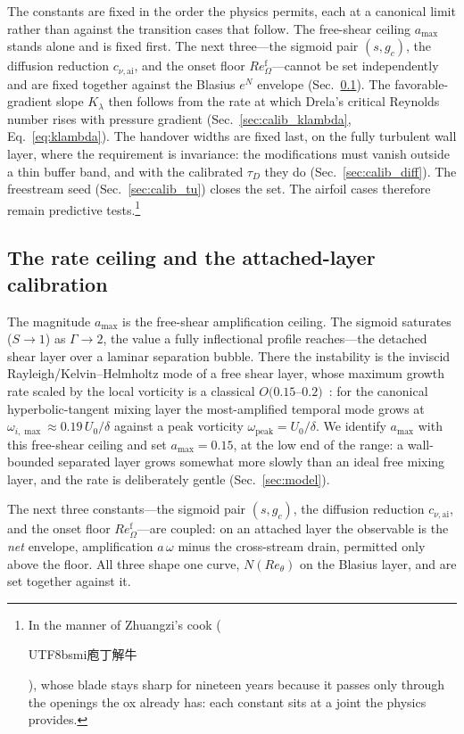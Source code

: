 \documentclass[journal]{new-aiaa}
\begin{document}
The constants are fixed in the order the physics permits, each at a
canonical limit rather than against the transition cases that follow. The
free-shear ceiling $a_{\max}$ stands alone and is fixed first. The next
three---the sigmoid pair $(s,g_c)$, the diffusion reduction
$c_{\nu,\mathrm{ai}}$, and the onset floor $Re_\Omega^{\mathrm{f}}$---cannot
be set independently and are fixed together against the Blasius $e^N$
envelope (Sec.~\ref{sec:calib_rate}). The favorable-gradient slope
$K_\lambda$ then follows from the rate at which Drela's critical Reynolds
number rises with pressure gradient (Sec.~\ref{sec:calib_klambda},
Eq.~\eqref{eq:klambda}). The handover widths are fixed last, on the fully
turbulent wall layer, where the requirement is invariance: the modifications
must vanish outside a thin buffer band, and with the calibrated $\tau_D$
they do (Sec.~\ref{sec:calib_diff}). The freestream seed
(Sec.~\ref{sec:calib_tu}) closes the set. The airfoil cases therefore remain
predictive tests.\footnote{In the manner of Zhuangzi's cook
(\begin{CJK}{UTF8}{bsmi}庖丁解牛\end{CJK}), whose blade stays sharp for
nineteen years because it passes only through the openings the ox already
has: each constant sits at a joint the physics provides.}

\subsection{The rate ceiling and the attached-layer calibration}\label{sec:calib_rate}

The magnitude $a_{\max}$ is the free-shear amplification ceiling. The sigmoid
saturates ($S\!\to\!1$) as $\Gamma\!\to\!2$, the value a fully inflectional
profile reaches---the detached shear layer over a laminar separation bubble.
There the instability is the inviscid Rayleigh/Kelvin--Helmholtz mode of a free
shear layer, whose maximum growth rate scaled by the local vorticity is a
classical $O(0.15$--$0.2)$~\cite{michalke_1964}: for the canonical
hyperbolic-tangent mixing layer the most-amplified temporal mode grows at
$\omega_{i,\max}\!\approx\!0.19\,U_0/\delta$ against a peak vorticity
$\omega_\mathrm{peak}\!=\!U_0/\delta$. We identify $a_{\max}$
with this free-shear ceiling and set $a_{\max}\!=\!0.15$, at the low end of the
range: a wall-bounded separated layer grows somewhat more slowly than an ideal
free mixing layer, and the rate is deliberately gentle (Sec.~\ref{sec:model}).

The next three constants---the sigmoid pair $(s,g_c)$, the diffusion
reduction $c_{\nu,\mathrm{ai}}$, and the onset floor
$Re_\Omega^{\mathrm{f}}$---are coupled: on an attached layer the observable
is the \emph{net} envelope, amplification $a\,\omega$ minus the cross-stream
drain, permitted only above the floor. All three shape one curve,
$N(Re_\theta)$ on the Blasius layer, and are set together against it.
\end{document}
